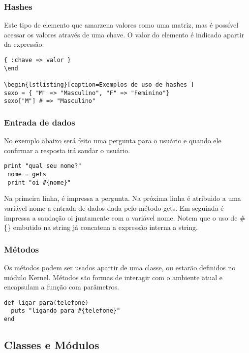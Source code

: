\documentclass[12pt]{article}
\begin{document}
\subsubsection { Hashes }

Este tipo de elemento que amarzena valores como uma matriz, mas é possível acessar os valores através de uma chave. O valor do elemento é indicado apartir da expressão:

\begin{lstlisting}[caption=Syntaxe do hash ]
{ :chave => valor }
\end

\begin{lstlisting}[caption=Exemplos de uso de hashes ]
sexo = { "M" => "Masculino", "F" => "Feminino"}
sexo["M"] # => "Masculino"
\end{lstlisting}

\subsubsection { Entrada de dados }

No exemplo abaixo será feito uma pergunta para o usuário e quando ele confirmar a resposta irá saudar o usuário.

\begin{lstlisting}[caption=Exemplo de entrada de dados ]
 print "qual seu nome?"
 nome = gets
 print "oi #{nome}"
\end{lstlisting}
 
Na primeira linha, é impressa a pergunta. Na próxima linha é atribuido a uma variável nome a entrada de dados dada pelo método gets.
Em seguinda é impressa a saudação oi juntamente com a variável nome. Notem que o uso de \#\{\} embutido na string já concatena a expressão interna a string.

\subsubsection { Métodos }

Os métodos podem ser usados apartir de uma classe, ou estarão definidos no módulo Kernel. Métodos são formas de interagir com o ambiente atual e encapsulam a função com parâmetros.

\begin{lstlisting}[caption=Exemplo de método ]
def ligar_para(telefone)
  puts "ligando para #{telefone}"
end
\end{lstlisting}

\subsection { Classes e Módulos }
 
\end{document}
